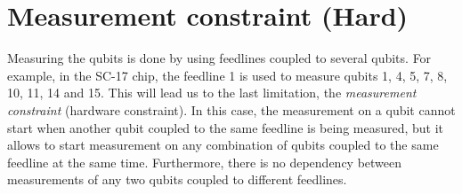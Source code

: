 \documentclass[11pt]{article}
\begin{document}















     



\section{Measurement constraint (Hard)}
\label{sec:org58adcb1}

Measuring the qubits is done by using feedlines coupled to several qubits.
For example, in the SC-17 chip, the feedline 1 is used to measure qubits 1, 4, 5, 7, 8, 10, 11, 14 and 15. This will lead us to the last limitation, the \emph{measurement constraint} (hardware constraint). In this case, the measurement on a qubit cannot start when
another qubit coupled to the same feedline is being measured, but it
allows to start measurement on any combination of qubits coupled to
the same feedline at the same time.  Furthermore, there is no dependency between
measurements of any two qubits coupled to different feedlines.
\end{document}
